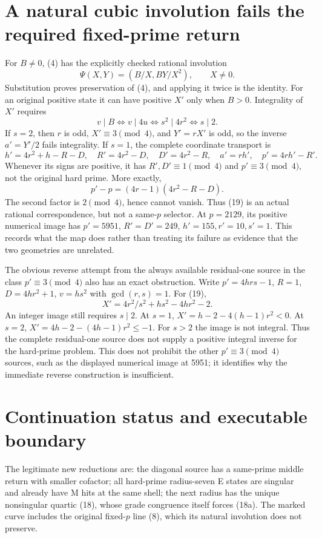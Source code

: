 \section{A natural cubic involution fails the required fixed-prime return}
For $B\ne0$, (4) has the explicitly checked rational involution
\[
 \Psi(X,Y)=(B/X,BY/X^2),\qquad X\ne0.                    \tag{19}
\]
Substitution proves preservation of (4), and applying it twice is the identity.
For an original positive state it can have positive $X'$ only when $B>0$.
Integrality of $X'$ requires
\[
 v\mid B\iff v\mid4u\iff s^2\mid4r^2\iff s\mid2.
\]
If $s=2$, then $r$ is odd, $X'\equiv3\pmod4$, and $Y'=rX'$ is odd, so the
inverse $a'=Y'/2$ fails integrality. If $s=1$, the complete coordinate transport is
\[
 h'=4r^2+h-R-D,\quad R'=4r^2-D,\quad D'=4r^2-R,
 \quad a'=rh',\quad p'=4rh'-R'.                          \tag{20}
\]
Whenever its signs are positive, it has $R',D'\equiv1\pmod4$ and
$p'\equiv3\pmod4$, not the original hard prime. More exactly,
\[
 \boxed{p'-p=(4r-1)(4r^2-R-D).}                          \tag{21}
\]
The second factor is $2\pmod4$, hence cannot vanish.
Thus (19) is an actual rational correspondence, but not a same-$p$ selector.
At $p=2129$, its positive numerical image has $p'=5951$, $R'=D'=249$,
$h'=155,r'=10,s'=1$. This records what the map does rather than treating its
failure as evidence that the two geometries are unrelated.

The obvious reverse attempt from the always available residual-one source in
the class $p'\equiv3\pmod4$ also has an exact obstruction. Write
$p'=4hrs-1$, $R=1$, $D=4hr^2+1$, $v=hs^2$ with $\gcd(r,s)=1$.
For (19),
\[
 X'=4r^2/s^2+hs^2-4hr^2-2.
\]
An integer image still requires $s\mid2$. At $s=1$,
$X'=h-2-4(h-1)r^2<0$. At $s=2$,
$X'=4h-2-(4h-1)r^2\le-1$. For $s>2$ the image is not integral.
Thus the complete residual-one source does not supply a positive integral
inverse for the hard-prime problem. This does not prohibit the other
$p'\equiv3\pmod4$ sources, such as the displayed numerical image at 5951;
it identifies why the immediate reverse construction is insufficient.

\section{Continuation status and executable boundary}
The legitimate new reductions are: the diagonal source has a same-prime middle
return with smaller cofactor; all hard-prime radius-seven E states are singular
and already have M hits at the same shell; the next radius has the unique
nonsingular quartic (18), whose grade congruence itself forces (18a). The marked curve includes the original fixed-$p$ line
(8), which its natural involution does not preserve.

